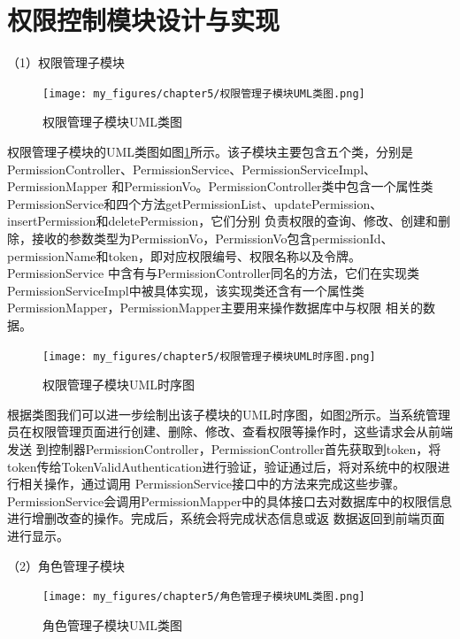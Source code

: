 \section{权限控制模块设计与实现}

（1）权限管理子模块

\begin{figure}[htb]
    \centering
    \texttt{[image: my\_figures/chapter5/权限管理子模块UML类图.png]}
    \caption{权限管理子模块UML类图}
    \label{fig:权限管理子模块UML类图}
\end{figure}

权限管理子模块的UML类图如图\ref{fig:权限管理子模块UML类图}所示。该子模块主要包含五个类，分别是PermissionController、PermissionService、PermissionServiceImpl、PermissionMapper
和PermissionVo。PermissionController类中包含一个属性类PermissionService和四个方法getPermissionList、updatePermission、insertPermission和deletePermission，它们分别
负责权限的查询、修改、创建和删除，接收的参数类型为PermissionVo，PermissionVo包含permissionId、permissionName和token，即对应权限编号、权限名称以及令牌。PermissionService
中含有与PermissionController同名的方法，它们在实现类PermissionServiceImpl中被具体实现，该实现类还含有一个属性类PermissionMapper，PermissionMapper主要用来操作数据库中与权限
相关的数据。

\begin{figure}[htb]
    \centering
    \texttt{[image: my\_figures/chapter5/权限管理子模块UML时序图.png]}
    \caption{权限管理子模块UML时序图}
    \label{fig:权限管理子模块UML时序图}
\end{figure}

根据类图我们可以进一步绘制出该子模块的UML时序图，如图\ref{fig:权限管理子模块UML时序图}所示。当系统管理员在权限管理页面进行创建、删除、修改、查看权限等操作时，这些请求会从前端发送
到控制器PermissionController，PermissionController首先获取到token，将token传给TokenValidAuthentication进行验证，验证通过后，将对系统中的权限进行相关操作，通过调用
PermissionService接口中的方法来完成这些步骤。PermissionService会调用PermissionMapper中的具体接口去对数据库中的权限信息进行增删改查的操作。完成后，系统会将完成状态信息或返
数据返回到前端页面进行显示。

（2）角色管理子模块

\begin{figure}[htb]
    \centering
    \texttt{[image: my\_figures/chapter5/角色管理子模块UML类图.png]}
    \caption{角色管理子模块UML类图}
    \label{fig:角色管理子模块UML类图}
\end{figure}


